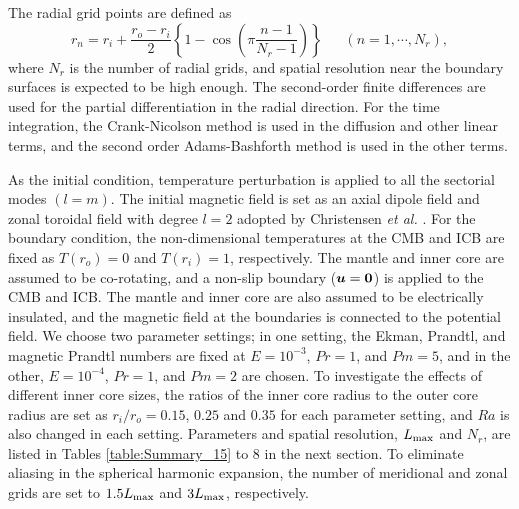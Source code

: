 The radial grid points are defined as
%
\begin{equation}
r_n = r_i + \frac{r_o - r_i}{2} \left\{ 1 - \cos \left( \pi \frac{n-1}{N_r-1} \right) \right\} ~~\;\;\;\; (n = 1, \cdots , N_r) ,
\label{eq:def_of_rn}
\end{equation}
%
where $N_r$ is the number of radial grids, and spatial resolution near the boundary surfaces is expected to be high enough.
The second-order finite differences are used for the partial differentiation in the radial direction.
For the time integration, the Crank-Nicolson method is used in the diffusion and other linear terms, and the second order Adams-Bashforth method is used in the other terms.

As the initial condition, temperature perturbation is applied to all the sectorial modes $(l = m)$. 
The initial magnetic field is set as an axial dipole field and zonal toroidal field with degree $l=2$ adopted by Christensen {\it et al.} . 
For the boundary condition, the non-dimensional temperatures at the CMB and ICB are fixed as $T(r_{o}) = 0$ and  $T(r_{i}) = 1$, respectively. 
The mantle and inner core are assumed to be co-rotating, and a non-slip boundary ($\mbox{\boldmath$u$} = \mbox{\boldmath$0$}$) is applied to the CMB and ICB. 
The mantle and inner core are also assumed to be electrically insulated, and the magnetic field at the boundaries is connected to the potential field.
{\color{blue}
We choose two parameter settings; %
in one setting, the Ekman, Prandtl, and magnetic Prandtl numbers are fixed at $E = 10^{-3}$, $Pr = 1$, and $Pm = 5$, and in the other, $E = 10^{-4}$, $Pr = 1$, and $Pm = 2$ are chosen. 
To investigate the effects of different inner core sizes, the ratios of the inner core radius to the outer core radius are set as $r_{i} / r_{o} = 0.15$, $0.25$ and $0.35$ for each parameter setting, and $Ra$ is also changed in each setting. 
Parameters and spatial resolution, $L_{\rm max}$ and $N_{r}$, are listed in Tables \ref{table:Summary_15} to 8 
in the next section. 
To eliminate aliasing in the spherical harmonic expansion, the number of meridional and zonal grids are set to $1.5 L_{\rm max}$ and $3 L_{\rm max}$, respectively.
}
